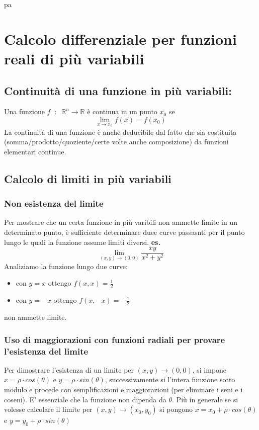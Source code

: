 pa\section*{Calcolo differenziale per funzioni reali di più variabili}
\subsection*{Continuità di una funzione in più variabili:}
Una funzione $f \;\;:\;\; \mathbb{R}^n \rightarrow  \mathbb{R}$ è continua in un punto $x_0$ se 
\[
    \lim_{x\rightarrow x_0} f(x) = f(x_0)
\]
La continuità di una funzione è anche deducibile dal fatto che sia costituita (somma/prodotto/quoziente/certe volte anche composizione) da funzioni elementari continue.\newline
\subsection*{Calcolo di limiti in più variabili}
\subsubsection*{Non esistenza del limite}
Per mostrare che un certa funzione in più varibili non ammette limite in un determinato punto, è sufficiente determinare duee curve passasnti per il punto lungo le quali la funzione assume limiti diversi.
\textbf{es.} 
\[
    \lim_{(x,y)\rightarrow (0,0)} \frac{xy}{x^2+y^2}
\]
Analiziamo la funzione lungo due curve:
\begin{itemize}
    \item con $y=x$ ottengo $f(x,x) = \frac{1}{2}$
    \item con $y=-x$ ottengo $f(x,-x) = - \frac{1}{2}$
\end{itemize}
non ammette limite.\newline
\subsubsection*{Uso di maggiorazioni con funzioni radiali per provare l'esistenza del limite}
Per dimostrare l'esistenza di un limite per $(x,y) \rightarrow (0,0)$, si impone $x=\rho \cdot  cos(\theta)$ e $y= \rho \cdot sin(\theta)$, successivamente si l'intera funzione sotto modulo e procede con semplificazioni e maggiorazioni (per eliminare i seni e i coseni). E' essenziale che la funzione non dipenda da $\theta$.\newline
Più in generale se si volesse calcolare il limite per $(x,y) \rightarrow (x_0, y_0)$ si pongono $x=x_0 +\rho \cdot  cos(\theta)$ e $y= y_0 + \rho \cdot sin(\theta)$
